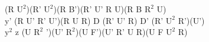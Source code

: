 (R $\text{U}^2$)(R' $\text{U}^2$)(R B')(R' U' R U)(R B $\text{R}^2$ U)\\
y' (R U' R' U')(R U R) D (R' U' R) D' (R' $\text{U}^2$ R')(U')\\
$\text{y}^2$ z (U $\text{R}^2$ ')(U' $\text{R}^2$)(U F')(U' R' U R)(U F $\text{U}^2$ R)\\
